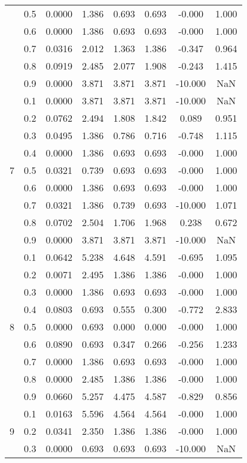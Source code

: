 \documentclass[11pt,a4paper]{report}
\begin{document}
\begin{longtable}{ | c | c || c | c | c | c | c | c | }
 & 0.5 & 0.0000 & 1.386 & 0.693 & 0.693 & -0.000 & 1.000 \\
 & 0.6 & 0.0000 & 1.386 & 0.693 & 0.693 & -0.000 & 1.000 \\
 & 0.7 & 0.0316 & 2.012 & 1.363 & 1.386 & -0.347 & 0.964 \\
 & 0.8 & 0.0919 & 2.485 & 2.077 & 1.908 & -0.243 & 1.415 \\
 & 0.9 & 0.0000 & 3.871 & 3.871 & 3.871 & -10.000 & NaN \\
 \hline
\multirow{9}{*}{7} & 0.1 & 0.0000 & 3.871 & 3.871 & 3.871 & -10.000 & NaN \\
 & 0.2 & 0.0762 & 2.494 & 1.808 & 1.842 & 0.089 & 0.951 \\
 & 0.3 & 0.0495 & 1.386 & 0.786 & 0.716 & -0.748 & 1.115 \\
 & 0.4 & 0.0000 & 1.386 & 0.693 & 0.693 & -0.000 & 1.000 \\
 & 0.5 & 0.0321 & 0.739 & 0.693 & 0.693 & -0.000 & 1.000 \\
 & 0.6 & 0.0000 & 1.386 & 0.693 & 0.693 & -0.000 & 1.000 \\
 & 0.7 & 0.0321 & 1.386 & 0.739 & 0.693 & -10.000 & 1.071 \\
 & 0.8 & 0.0702 & 2.504 & 1.706 & 1.968 & 0.238 & 0.672 \\
 & 0.9 & 0.0000 & 3.871 & 3.871 & 3.871 & -10.000 & NaN \\
 \hline
\multirow{9}{*}{8} & 0.1 & 0.0642 & 5.238 & 4.648 & 4.591 & -0.695 & 1.095 \\
 & 0.2 & 0.0071 & 2.495 & 1.386 & 1.386 & -0.000 & 1.000 \\
 & 0.3 & 0.0000 & 1.386 & 0.693 & 0.693 & -0.000 & 1.000 \\
 & 0.4 & 0.0803 & 0.693 & 0.555 & 0.300 & -0.772 & 2.833 \\
 & 0.5 & 0.0000 & 0.693 & 0.000 & 0.000 & -0.000 & 1.000 \\
 & 0.6 & 0.0890 & 0.693 & 0.347 & 0.266 & -0.256 & 1.233 \\
 & 0.7 & 0.0000 & 1.386 & 0.693 & 0.693 & -0.000 & 1.000 \\
 & 0.8 & 0.0000 & 2.485 & 1.386 & 1.386 & -0.000 & 1.000 \\
 & 0.9 & 0.0660 & 5.257 & 4.475 & 4.587 & -0.829 & 0.856 \\
 \hline
\multirow{9}{*}{9} & 0.1 & 0.0163 & 5.596 & 4.564 & 4.564 & -0.000 & 1.000 \\
 & 0.2 & 0.0341 & 2.350 & 1.386 & 1.386 & -0.000 & 1.000 \\
 & 0.3 & 0.0000 & 0.693 & 0.693 & 0.693 & -10.000 & NaN \\

\end{longtable}
\end{document}
